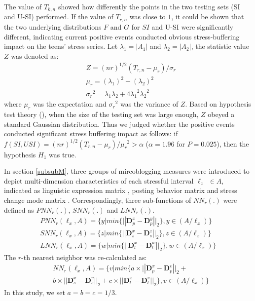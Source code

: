 The value of $T_{k,n}$ showed how differently the points in the two testing sets (SI and U-SI) performed.
If the value of $T_{r,n}$ was close to $1$,
it could be shown that the two underlying distributions $F$ and $G$ for $SI$ and U-SI were significantly different,
indicating current positive events conducted obvious stress-buffering impact on the teens' stress series.
Let $\lambda_1=|A_1|$ and $\lambda_2=|A_2|$, the statistic value $Z$ was denoted as:
\begin{align}
&Z=(nr)^{1/2}(T_{r,n}-\mu_{r})/\sigma_{r}\\
&\mu_r=(\lambda_1)^2+(\lambda_2)^2\\
&{\sigma_r}^2=\lambda_1\lambda_2+4{\lambda_1}^2{\lambda_2}^2
\end{align}
where $\mu_r$ was the expectation and ${\sigma_r}^2$ was the variance of $Z$.
Based on hypothesis test theory (\cite{Johnson2012Applied}),
when the size of the testing set was large enough,
$Z$ obeyed a standard Gaussian distribution.
Thus we judged whether the positive events conducted significant stress buffering impact as follows:
if $f(SI,USI)=(nr)^{1/2}(T_{r,n}-\mu_{r})/{\mu_r}^2>\alpha$ ($\alpha = 1.96$ for $P=0.025$),
then the hypothesis $H_1$ was true.

In section \ref{subsubM},
three groups of mircoblogging measures
were introduced to depict multi-dimension characteristics of each stressful interval $\ell_x$ $\in A$,
indicated as linguistic expression matrix , posting behavior matrix 
and stress change mode matrix .
Correspondingly, three sub-functions of $NN_r(.)$ were defined as $PNN_r(.)$, $SNN_r(.)$ and $LNN_r(.)$.
\begin{equation}
\begin{aligned}
& PNN_r(\ell_x,A)
= \{y | min\{||\textbf{D}_p^x-\textbf{D}_p^y ||_2\}, y\in(A/\ell_x)\} &\\
& SNN_r(\ell_x,A)
= \{z | min\{||\textbf{D}_s^x-\textbf{D}_s^z ||_2\}, z\in(A/\ell_x)\} \\
& LNN_r(\ell_x,A)
= \{w | min\{||\textbf{D}_l^x-\textbf{D}_l^w ||_2\}, w\in(A/\ell_x)\} &
 \end{aligned}
 \end{equation}
The $r$-th nearest neighbor was re-calculated as:
\begin{align}
&NN_r(\ell_x,A) = \{v | min\{a \times ||\textbf{D}_p^x-\textbf{D}_p^v||_2+\\
&b \times ||\textbf{D}_s^x-\textbf{D}_s^v||_2+
c \times ||\textbf{D}_l^x-\textbf{D}_l^v||_2\}, v\in(A/\ell_x) \}
\end{align}
In this study, we set $a = b = c = 1/3$.


